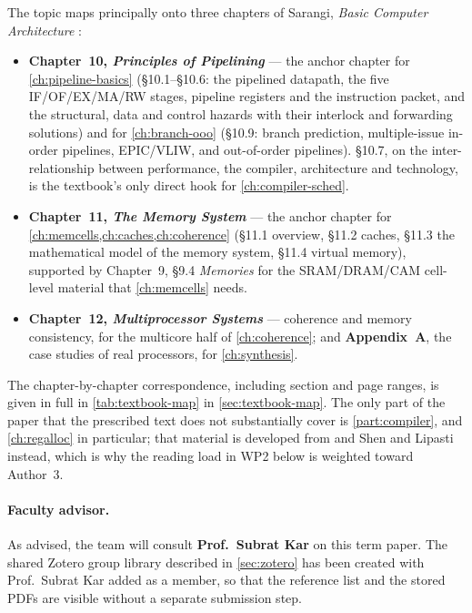 \documentclass[11pt,a4paper]{report}
\begin{document}
The topic maps principally onto three chapters of Sarangi,
\emph{Basic Computer Architecture} \cite{sarangi}:

\begin{itemize}[leftmargin=*]
  \item \textbf{Chapter~10, \emph{Principles of Pipelining}} --- the
    anchor chapter for \cref{ch:pipeline-basics} (\S10.1--\S10.6: the
    pipelined datapath, the five IF/OF/EX/MA/RW stages, pipeline
    registers and the instruction packet, and the structural, data and
    control hazards with their interlock and forwarding solutions) and
    for \cref{ch:branch-ooo} (\S10.9: branch prediction, multiple-issue
    in-order pipelines, EPIC/VLIW, and out-of-order pipelines). \S10.7,
    on the inter-relationship between performance, the compiler,
    architecture and technology, is the textbook's only direct hook for
    \cref{ch:compiler-sched}.
  \item \textbf{Chapter~11, \emph{The Memory System}} --- the anchor
    chapter for \cref{ch:memcells,ch:caches,ch:coherence} (\S11.1
    overview, \S11.2 caches, \S11.3 the mathematical model of the memory
    system, \S11.4 virtual memory), supported by Chapter~9, \S9.4
    \emph{Memories} for the SRAM/DRAM/CAM cell-level material that
    \cref{ch:memcells} needs.
  \item \textbf{Chapter~12, \emph{Multiprocessor Systems}} --- coherence
    and memory consistency, for the multicore half of
    \cref{ch:coherence}; and \textbf{Appendix~A}, the case studies of
    real processors, for \cref{ch:synthesis}.
\end{itemize}

The chapter-by-chapter correspondence, including section and page
ranges, is given in full in \cref{tab:textbook-map} in
\cref{sec:textbook-map}. The only part of the paper that the prescribed
text does not substantially cover is \cref{part:compiler}, and
\cref{ch:regalloc} in particular; that material is developed from
\cite{hennessy} and Shen and Lipasti
\cite{shen} instead, which is why the reading load in WP2 below is
weighted toward Author~3.

\paragraph{Faculty advisor.} As advised, the team will consult
\textbf{Prof.\ Subrat Kar} on this term paper. The shared Zotero group
library described in \cref{sec:zotero} has been created with
Prof.\ Subrat Kar added as a member, so that the reference list and the
stored PDFs are visible without a separate submission step.
\end{document}
